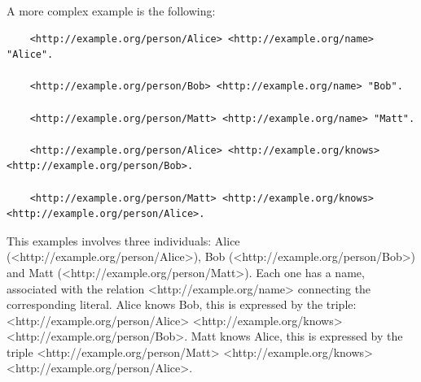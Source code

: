A more complex example is the following:
\begin{lstlisting}
    <http://example.org/person/Alice> <http://example.org/name> "Alice".

    <http://example.org/person/Bob> <http://example.org/name> "Bob".

    <http://example.org/person/Matt> <http://example.org/name> "Matt".

    <http://example.org/person/Alice> <http://example.org/knows> <http://example.org/person/Bob>.

    <http://example.org/person/Matt> <http://example.org/knows> <http://example.org/person/Alice>.
\end{lstlisting}
This examples involves three individuals: Alice (<http://example.org/person/Alice>), Bob (<http://example.org/person/Bob>) and Matt (<http://example.org/person/Matt>).
Each one has a name, associated with the relation <http://example.org/name> connecting the corresponding literal. Alice knows Bob, this is expressed by the triple: <http://example.org/person/Alice> <http://example.org/knows> <http://example.org/person/Bob>. Matt knows Alice, this is expressed by the triple <http://example.org/person/Matt> <http://example.org/knows> <http://example.org/person/Alice>.



